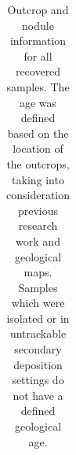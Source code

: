 \documentclass[
  a4paper,
  DIV=11,
  numbers=noendperiod]{scrreprt}
\begin{document}
\begin{longtable}[]{@{}
  >{\raggedright\arraybackslash}p{}
  >{\raggedright\arraybackslash}p{}
  >{\raggedright\arraybackslash}p{}
  >{\raggedright\arraybackslash}p{}
  >{\raggedright\arraybackslash}p{}
  >{\raggedright\arraybackslash}p{}
  >{\raggedright\arraybackslash}p{}
  >{\raggedright\arraybackslash}p{}@{}}

\caption{\label{tbl-frames-outcropdata}Outcrop and nodule information
for all recovered samples. The age was defined based on the location of
the outcrops, taking into consideration previous research work and
geological maps. Samples which were isolated or in untrackable secondary
deposition settings do not have a defined geological age.}

\tabularnewline


\end{longtable}
\end{document}
